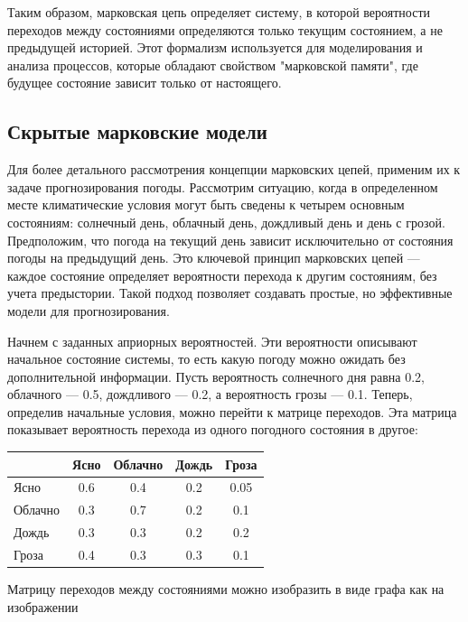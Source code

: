 Таким образом, марковская цепь определяет систему, в которой вероятности переходов между состояниями определяются только текущим состоянием, а не предыдущей историей. Этот формализм используется для моделирования и анализа процессов, которые обладают свойством "марковской памяти", где будущее состояние зависит только от настоящего.

\subsection{Скрытые марковские модели}

Для более детального рассмотрения концепции марковских цепей, применим их к задаче прогнозирования погоды. Рассмотрим ситуацию, когда в определенном месте климатические условия могут быть сведены к четырем основным состояниям: солнечный день, облачный день, дождливый день и день с грозой. Предположим, что погода на текущий день зависит исключительно от состояния погоды на предыдущий день. Это ключевой принцип марковских цепей — каждое состояние определяет вероятности перехода к другим состояниям, без учета предыстории. Такой подход позволяет создавать простые, но эффективные модели для прогнозирования.

Начнем с заданных априорных вероятностей. Эти вероятности описывают начальное состояние системы, то есть какую погоду можно ожидать без дополнительной информации. Пусть вероятность солнечного дня равна 0.2, облачного — 0.5, дождливого — 0.2, а вероятность грозы — 0.1. Теперь, определив начальные условия, можно перейти к матрице переходов. Эта матрица показывает вероятность перехода из одного погодного состояния в другое:

\begin{center}
	\begin{tabular}{|l|c|c|c|c|}
		\hline
		\textbf{} & Ясно & Облачно & Дождь & Гроза \\ \hline
		Ясно      & 0.6  & 0.4     & 0.2   & 0.05  \\ \hline
		Облачно   & 0.3  & 0.7     & 0.2   & 0.1   \\ \hline
		Дождь     & 0.3  & 0.3     & 0.2   & 0.2   \\ \hline
		Гроза     & 0.4  & 0.3     & 0.3   & 0.1   \\ \hline
	\end{tabular}
\end{center}
\label{tab:pogoda_prob}

Матрицу переходов между состояниями можно изобразить в виде графа как на изображении 

